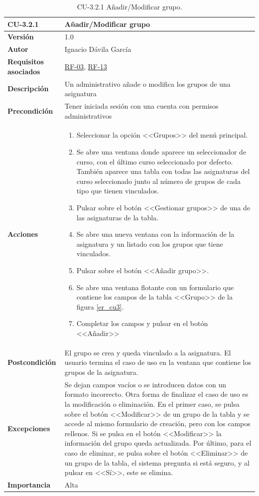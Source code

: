 \begin{table}[p]
\label{table:CU-3.2.1}
	\centering
	\begin{tabularx}{\linewidth}{ p{} p{} }
		\toprule
		\textbf{CU-3.2.1}    & \textbf{Añadir/Modificar grupo}\\
		\toprule
		\textbf{Versión}              & 1.0    \\
		\textbf{Autor}                & Ignacio Dávila García \\
		\textbf{Requisitos asociados} & \hyperref[itm:RF3]{RF-03}, \hyperref[itm:RF13]{RF-13} \\
		\textbf{Descripción}          & Un administrativo añade o modifica los grupos de una asignatura \\
		\textbf{Precondición}         & Tener iniciada sesión con una cuenta con permisos administrativos \\
		\textbf{Acciones}             &
		\begin{enumerate}
			\def\labelenumi{\arabic{enumi}.}
			\tightlist
			\item Seleccionar la opción <<Grupos>> del menú principal.
			\item Se abre una ventana donde aparece un seleccionador de curso, con el último curso seleccionado por defecto. También aparece una tabla con todas las asignaturas del curso seleccionado junto al número de grupos de cada tipo que tienen vinculados.
			\item Pulsar sobre el botón <<Gestionar grupos>> de una de las asignaturas de la tabla.
			\item Se abre una nueva ventana con la información de la asignatura y un listado con los grupos que tiene vinculados.
			\item Pulsar sobre el botón <<Añadir grupo>>.
			\item Se abre una ventana flotante con un formulario que contiene los campos de la tabla <<Grupo>> de la figura \ref{er_cu3}.
			\item Completar los campos y pulsar en el botón <<Añadir>>
		\end{enumerate}\\
		\textbf{Postcondición}        & El grupo se crea y queda vinculado a la asignatura. El usuario termina el caso de uso en la ventana que contiene los grupos de la asignatura. \\
		\textbf{Excepciones}          & Se dejan campos vacíos o se introducen datos con un formato incorrecto. Otra forma de finalizar el caso de uso es la modificación o eliminación. En el primer caso, se pulsa sobre el botón <<Modificar>> de un grupo de la tabla y se accede al mismo formulario de creación, pero con los campos rellenos. Si se pulsa en el botón <<Modificar>> la información del grupo queda actualizada. Por último, para el caso de eliminar, se pulsa sobre el botón <<Eliminar>> de un grupo de la tabla, el sistema pregunta si está seguro, y al pulsar en <<Sí>>, este se elimina. \\
		\textbf{Importancia}          & Alta \\
		\bottomrule
	\end{tabularx}
	\caption{CU-3.2.1 Añadir/Modificar grupo.}
\end{table}
\FloatBarrier

